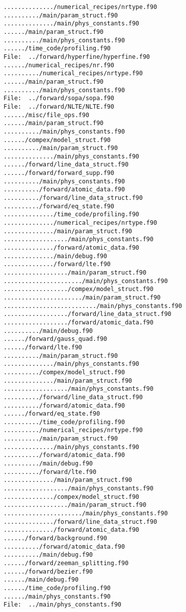 \begin{verbatim}
............../numerical_recipes/nrtype.f90
........../main/param_struct.f90
............../main/phys_constants.f90
....../main/param_struct.f90
........../main/phys_constants.f90
....../time_code/profiling.f90
File:  ../forward/hyperfine/hyperfine.f90
....../numerical_recipes/nr.f90
........../numerical_recipes/nrtype.f90
....../main/param_struct.f90
........../main/phys_constants.f90
File:  ../forward/sopa/sopa.f90
File:  ../forward/NLTE/NLTE.f90
....../misc/file_ops.f90
....../main/param_struct.f90
........../main/phys_constants.f90
....../compex/model_struct.f90
........../main/param_struct.f90
............../main/phys_constants.f90
....../forward/line_data_struct.f90
....../forward/forward_supp.f90
........../main/phys_constants.f90
........../forward/atomic_data.f90
........../forward/line_data_struct.f90
........../forward/eq_state.f90
............../time_code/profiling.f90
............../numerical_recipes/nrtype.f90
............../main/param_struct.f90
................../main/phys_constants.f90
............../forward/atomic_data.f90
............../main/debug.f90
............../forward/lte.f90
................../main/param_struct.f90
....................../main/phys_constants.f90
................../compex/model_struct.f90
....................../main/param_struct.f90
........................../main/phys_constants.f90
................../forward/line_data_struct.f90
................../forward/atomic_data.f90
........../main/debug.f90
....../forward/gauss_quad.f90
....../forward/lte.f90
........../main/param_struct.f90
............../main/phys_constants.f90
........../compex/model_struct.f90
............../main/param_struct.f90
................../main/phys_constants.f90
........../forward/line_data_struct.f90
........../forward/atomic_data.f90
....../forward/eq_state.f90
........../time_code/profiling.f90
........../numerical_recipes/nrtype.f90
........../main/param_struct.f90
............../main/phys_constants.f90
........../forward/atomic_data.f90
........../main/debug.f90
........../forward/lte.f90
............../main/param_struct.f90
................../main/phys_constants.f90
............../compex/model_struct.f90
................../main/param_struct.f90
....................../main/phys_constants.f90
............../forward/line_data_struct.f90
............../forward/atomic_data.f90
....../forward/background.f90
........../forward/atomic_data.f90
........../main/debug.f90
....../forward/zeeman_splitting.f90
....../forward/bezier.f90
....../main/debug.f90
....../time_code/profiling.f90
....../main/phys_constants.f90
File:  ../main/phys_constants.f90

\end{verbatim}
